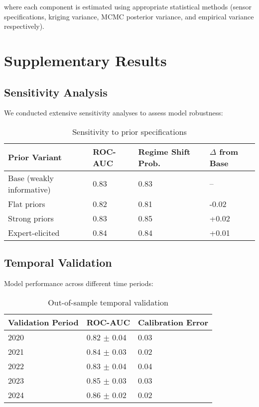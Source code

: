 \documentclass[11pt,a4paper]{article}
\begin{document}
where each component is estimated using appropriate statistical methods (sensor specifications, kriging variance, MCMC posterior variance, and empirical variance respectively).

\section{Supplementary Results}

\subsection{Sensitivity Analysis}

We conducted extensive sensitivity analyses to assess model robustness:

\begin{table}[H]
\centering
\caption{Sensitivity to prior specifications}
\begin{tabular}{llll}
\toprule
\textbf{Prior Variant} & \textbf{ROC-AUC} & \textbf{Regime Shift Prob.} & \textbf{$\Delta$ from Base} \\
\midrule
Base (weakly informative) & 0.83 & 0.83 & -- \\
Flat priors & 0.82 & 0.81 & -0.02 \\
Strong priors & 0.83 & 0.85 & +0.02 \\
Expert-elicited & 0.84 & 0.84 & +0.01 \\
\bottomrule
\end{tabular}
\end{table}

\subsection{Temporal Validation}

Model performance across different time periods:

\begin{table}[H]
\centering
\caption{Out-of-sample temporal validation}
\begin{tabular}{lll}
\toprule
\textbf{Validation Period} & \textbf{ROC-AUC} & \textbf{Calibration Error} \\
\midrule
2020 & 0.82 $\pm$ 0.04 & 0.03 \\
2021 & 0.84 $\pm$ 0.03 & 0.02 \\
2022 & 0.83 $\pm$ 0.04 & 0.04 \\
2023 & 0.85 $\pm$ 0.03 & 0.03 \\
2024 & 0.86 $\pm$ 0.02 & 0.02 \\
\bottomrule
\end{tabular}
\end{table}
\end{document}
